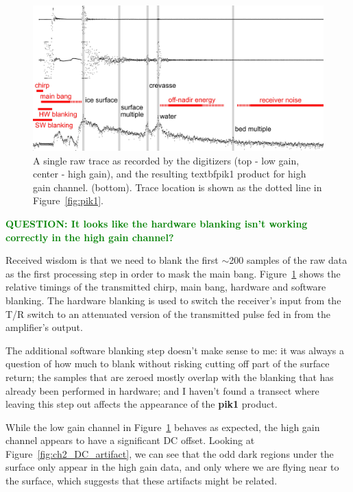 \documentclass[11pt]{article}
\newcommand{\question}[1]{\ifthenelse{\boolean{include-questions}} {\textcolor{Green}{\textbf{QUESTION: #1}}}{}}
\newcommand{\figref}[1]{Figure~\ref{#1}}
\begin{document}
\begin{figure}[ht!]
\centering
\includegraphics[width=1.0\columnwidth]{figures/trace.jpg}
\caption[]{A single raw trace as recorded by the digitizers (top - low gain, center - high gain), and the resulting textbf{pik1} product for high gain channel. (bottom). Trace location is shown as the dotted line in \figref{fig:pik1}.}
\label{fig:trace}
\end{figure}

\question{It looks like the hardware blanking isn't working correctly in the high gain channel?}

Received wisdom is that we need to blank the first $\sim$200 samples of the raw data as the first processing step in order to mask the main bang. \figref{fig:trace} shows the relative timings of the transmitted chirp, main bang, hardware and software blanking. The hardware blanking is used to switch the receiver's input from the T/R switch to an attenuated version of the transmitted pulse fed in from the amplifier's output. 

The additional software blanking step doesn't make sense to me: it was always a question of how much to blank without risking cutting off part of the surface return; the samples that are zeroed mostly overlap with the blanking that has already been performed in hardware; and I haven't found a transect where leaving this step out affects the appearance of the \textbf{pik1} product.

While the low gain channel in \figref{fig:trace} behaves as expected, the high gain channel appears to have a significant DC offset. Looking at \figref{fig:ch2_DC_artifact}, we can see that the odd dark regions under the surface only appear in the high gain data, and only where we are flying near to the surface, which suggests that these artifacts might be related. 
\end{document}
